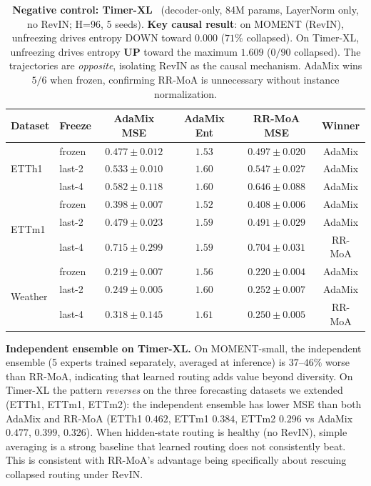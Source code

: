\documentclass{article}
\begin{document}
\begin{table}[!htbp]
\centering
\caption{\textbf{Negative control: Timer-XL}~\citep{liu2025timerxl} (decoder-only, 84M params, LayerNorm only, no RevIN; H=96, 5 seeds). \textbf{Key causal result}: on MOMENT (RevIN), unfreezing drives entropy DOWN toward $0.000$ ($71\%$ collapsed). On Timer-XL, unfreezing drives entropy \textbf{UP} toward the maximum $1.609$ ($0/90$ collapsed). The trajectories are \emph{opposite}, isolating RevIN as the causal mechanism. AdaMix wins $5/6$ when frozen, confirming RR-MoA is unnecessary without instance normalization.}
\label{tab:timer_xl}
\small
\begin{tabular}{@{}llcccc@{}}
\toprule
Dataset & Freeze & AdaMix MSE & AdaMix Ent & RR-MoA MSE & Winner \\
\midrule
\multirow{3}{*}{ETTh1} & frozen & $\mathbf{0.477 \pm 0.012}$ & $1.53$ & $0.497 \pm 0.020$ & AdaMix \\
 & last-2 & $\mathbf{0.533 \pm 0.010}$ & $1.60$ & $0.547 \pm 0.027$ & AdaMix \\
 & last-4 & $\mathbf{0.582 \pm 0.118}$ & $1.60$ & $0.646 \pm 0.088$ & AdaMix \\
\midrule
\multirow{3}{*}{ETTm1} & frozen & $\mathbf{0.398 \pm 0.007}$ & $1.52$ & $0.408 \pm 0.006$ & AdaMix \\
 & last-2 & $\mathbf{0.479 \pm 0.023}$ & $1.59$ & $0.491 \pm 0.029$ & AdaMix \\
 & last-4 & $0.715 \pm 0.299$ & $1.59$ & $\mathbf{0.704 \pm 0.031}$ & RR-MoA \\
\midrule
\multirow{3}{*}{Weather} & frozen & $\mathbf{0.219 \pm 0.007}$ & $1.56$ & $0.220 \pm 0.004$ & AdaMix \\
 & last-2 & $\mathbf{0.249 \pm 0.005}$ & $1.60$ & $0.252 \pm 0.007$ & AdaMix \\
 & last-4 & $0.318 \pm 0.145$ & $1.61$ & $\mathbf{0.250 \pm 0.005}$ & RR-MoA \\
\bottomrule
\end{tabular}
\end{table}

\textbf{Independent ensemble on Timer-XL.} On MOMENT-small, the independent ensemble (5 experts trained separately, averaged at inference) is $37$--$46\%$ worse than RR-MoA, indicating that learned routing adds value beyond diversity. On Timer-XL the pattern \emph{reverses} on the three forecasting datasets we extended (ETTh1, ETTm1, ETTm2): the independent ensemble has lower MSE than both AdaMix and RR-MoA (ETTh1 $0.462$, ETTm1 $0.384$, ETTm2 $0.296$ vs AdaMix $0.477$, $0.399$, $0.326$). When hidden-state routing is healthy (no RevIN), simple averaging is a strong baseline that learned routing does not consistently beat. This is consistent with RR-MoA's advantage being specifically about rescuing collapsed routing under RevIN.
\end{document}
